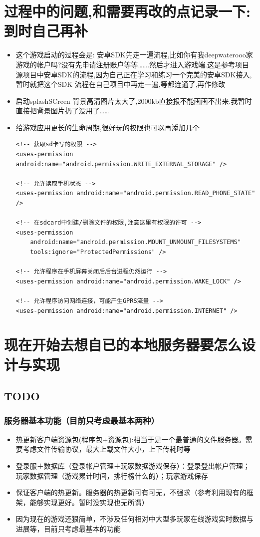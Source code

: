 \documentclass[9pt, b5paper]{article}
\begin{document}
\section{过程中的问题,和需要再改的点记录一下: 到时自己再补}
\label{sec-3}
\begin{itemize}
\item 这个游戏启动的过程会是: 安卓SDK先走一遍流程,比如你有我deepwaterooo家游戏的帐户吗?没有先申请注册账户等等\ldots{}\ldots{}.然后才进入游戏端.这是参考项目源项目中安卓SDK的流程,因为自己正在学习和练习一个完美的安卓SDK接入,暂时就把这个SDK 流程在自己项目中再走一遍,等都连通了,再作修改
\item 启动splashSCreen 背景高清图片太大了,2000kb直接报不能画画不出来.我暂时直接把背景图片扔了没用了\ldots{}\ldots{}
\item 给游戏应用更长的生命周期,很好玩的权限也可以再添加几个
\begin{verbatim}
<!-- 获取sd卡写的权限 -->
<uses-permission android:name="android.permission.WRITE_EXTERNAL_STORAGE" />

<!-- 允许读取手机状态 -->
<uses-permission android:name="android.permission.READ_PHONE_STATE" />

<!-- 在sdcard中创建/删除文件的权限,注意这里有权限的许可 -->
<uses-permission
    android:name="android.permission.MOUNT_UNMOUNT_FILESYSTEMS"
    tools:ignore="ProtectedPermissions" />

<!-- 允许程序在手机屏幕关闭后后台进程仍然运行 -->
<uses-permission android:name="android.permission.WAKE_LOCK" />

<!-- 允许程序访问网络连接，可能产生GPRS流量 -->
<uses-permission android:name="android.permission.INTERNET" />
\end{verbatim}
\end{itemize}

\section{现在开始去想自已的本地服务器要怎么设计与实现}
\label{sec-4}

\subsection{{\bfseries\sffamily TODO} }
\label{sec-4-1}
\subsubsection{服务器基本功能（目前只考虑最基本两种）}
\label{sec-4-1-1}
\begin{itemize}
\item 热更新客户端资源包(程序包+资源包):相当于是一个最普通的文件服务器。需要考虑文件传输协议，最大上载文件大小，上下传耗时等
\item 登录服＋数据库（登录帐户管理＋玩家数据游戏保存）：登录登出帐户管理；玩家数据管理（游戏累计时间，排行榜什么的）；玩家游戏保存
\item 保证客户端的热更新。服务器的热更新可有可无，不强求（参考利用现有的框架，能够实现更好。暂时没实现也无所谓）
\item 因为现在的游戏还狠简单，不涉及任何相对中大型多玩家在线游戏实时数据与进展等，目前只考虑最基本的功能
\end{itemize}
\end{document}

